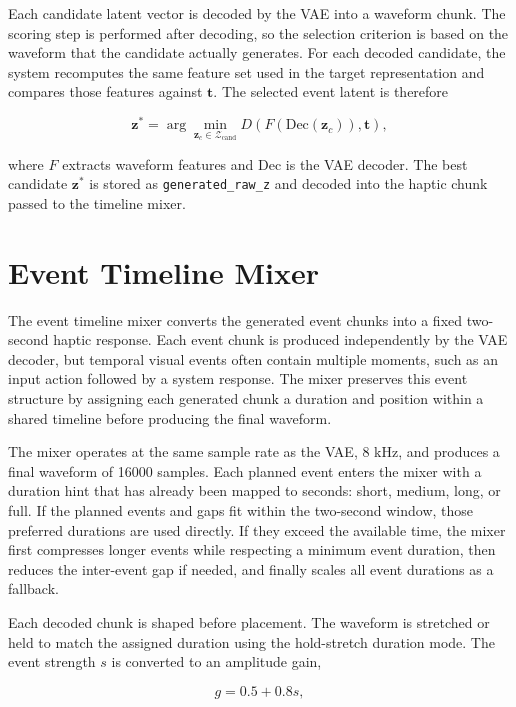 Each candidate latent vector is decoded by the VAE into a waveform chunk. The scoring step is performed after decoding, so the selection criterion is based on the waveform that the candidate actually generates. For each decoded candidate, the system recomputes the same feature set used in the target representation and compares those features against $\mathbf{t}$. The selected event latent is therefore

\begin{equation}
\mathbf{z}^{*}
=
\arg\min_{\mathbf{z}_c \in \mathcal{Z}_{\mathrm{cand}}}
D\left(F\left(\mathrm{Dec}(\mathbf{z}_c)\right), \mathbf{t}\right),
\end{equation}

where $F$ extracts waveform features and $\mathrm{Dec}$ is the VAE decoder. The best candidate $\mathbf{z}^{*}$ is stored as \texttt{generated\_raw\_z} and decoded into the haptic chunk passed to the timeline mixer.

\section{Event Timeline Mixer}

The event timeline mixer converts the generated event chunks into a fixed two-second haptic response. Each event chunk is produced independently by the VAE decoder, but temporal visual events often contain multiple moments, such as an input action followed by a system response. The mixer preserves this event structure by assigning each generated chunk a duration and position within a shared timeline before producing the final waveform.

The mixer operates at the same sample rate as the VAE, 8 kHz, and produces a final waveform of 16000 samples. Each planned event enters the mixer with a duration hint that has already been mapped to seconds: short, medium, long, or full. If the planned events and gaps fit within the two-second window, those preferred durations are used directly. If they exceed the available time, the mixer first compresses longer events while respecting a minimum event duration, then reduces the inter-event gap if needed, and finally scales all event durations as a fallback.

Each decoded chunk is shaped before placement. The waveform is stretched or held to match the assigned duration using the hold-stretch duration mode. The event strength $s$ is converted to an amplitude gain,

\begin{equation}
g = 0.5 + 0.8s,
\end{equation}

